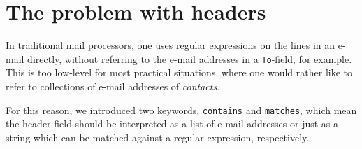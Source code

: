 \documentclass[a4paper]{article}
\begin{document}
\section{The problem with headers}

In traditional mail processors, one uses regular expressions on the lines in an
e-mail directly, without referring to the e-mail addresses in a \texttt{To}-field,
for example.  This is too low-level for most practical situations, where one would
rather like to refer to collections of e-mail addresses of \emph{contacts}.

For this reason, we introduced two keywords, \texttt{contains} and
\texttt{matches}, which mean the header field should be interpreted as a list
of e-mail addresses or just as a string which can be matched against a regular
expression, respectively.
\end{document}
